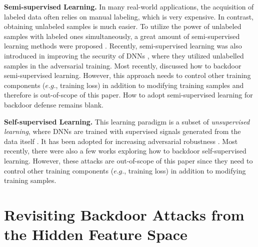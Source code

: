\noindent \textbf{Semi-supervised Learning.} 
In many real-world applications, the acquisition of labeled data often relies on manual labeling, which is very expensive. In contrast, obtaining unlabeled samples is much easier. To utilize the power of unlabeled samples with labeled ones simultaneously, a great amount of semi-supervised learning methods were proposed \citep{gao2017semi,berthelot2019mixmatch,van2020survey}. Recently, semi-supervised learning was also introduced in improving the security of DNNs \citep{stanforth2019,carmon2019}, where they utilized unlabelled samples in the adversarial training. Most recently, \citep{yan2021dehib} discussed how to backdoor semi-supervised learning. However, this approach needs to control other training components ($e.g.$, training loss) in addition to modifying training samples and therefore is out-of-scope of this paper. How to adopt semi-supervised learning for backdoor defense remains blank.

\noindent \textbf{Self-supervised Learning.}
This learning paradigm is a subset of \emph{unsupervised learning}, where DNNs are trained with supervised signals generated from the data itself \citep{chen2020simple,grill2020bootstrap,liu2021self}. It has been adopted for increasing adversarial robustness \citep{hendrycks2019using,wu2021adversarial,shi2021online}. Most recently, there were also a few works \citep{saha2021backdoor,carlini2021poisoning,jia2021badencoder} exploring how to backdoor self-supervised learning. However, these attacks are out-of-scope of this paper since they need to control other training components ($e.g.$, training loss) in addition to modifying training samples.

\vspace{-0.5em}
\section{Revisiting Backdoor Attacks from the Hidden Feature Space}
\vspace{-0.5em}
\label{sec:motivation}

